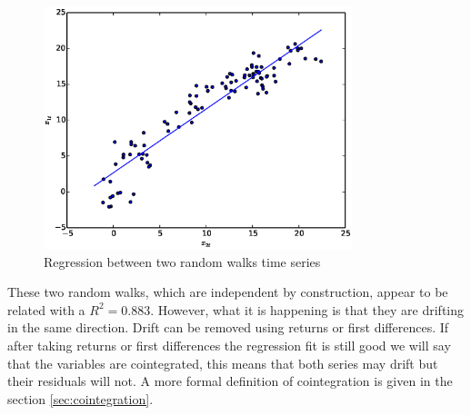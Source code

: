 \begin{figure}[!h]
  \centering
  \includegraphics[width=0.8\textwidth]{img/spurious2}
  \caption{Regression between two random walks time series}
  \label{fig:spurious2}
\end{figure}

These two random walks, which are independent by construction, appear to be related with a $R^2=0.883$. However, what it is happening is that they are drifting in the same direction. Drift can be removed using returns or first differences.
If after taking returns or first differences the regression fit is still good we will say that the variables are cointegrated, this means that both series may drift but their residuals will not. A more formal definition of cointegration is given in the section \ref{sec:cointegration}.

